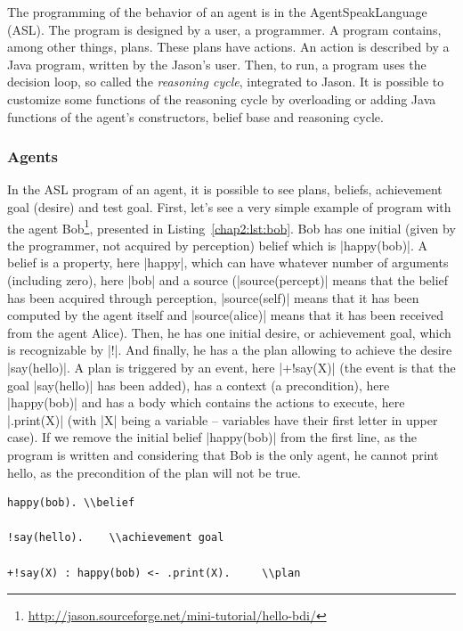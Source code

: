 \documentclass[a4paper,11pt,twoside]{StyleThese}
\begin{document}
The programming of the behavior of an agent is in the AgentSpeakLanguage (ASL). The program is designed by a user, a programmer. A program contains, among other things, plans. These plans have actions. An action is described by a Java program, written by the Jason's user. Then, to run, a program uses the decision loop, so called the \textit{reasoning cycle}, integrated to Jason. It is possible to customize some functions of the reasoning cycle by overloading or adding Java functions of the agent's constructors, belief base and reasoning cycle. 

\subsubsection{Agents} In the ASL program of an agent, it is possible to see plans, beliefs, achievement goal (desire) and test goal. First, let's see a very simple example of program with the agent Bob\footnote{\url{http://jason.sourceforge.net/mini-tutorial/hello-bdi/}}, presented in Listing~\ref{chap2:lst:bob}. Bob has one initial (\ie given by the programmer, not acquired by perception) belief which is |happy(bob)|. A belief is a property, here |happy|, which can have whatever number of arguments (including zero), here |bob| and a source (\eg |source(percept)| means that the belief has been acquired through perception, |source(self)| means that it has been computed by the agent itself and |source(alice)| means that it has been received from the agent Alice). Then, he has one initial desire, or achievement goal, which is recognizable by |!|. And finally, he has a the plan allowing to achieve the desire |say(hello)|. A plan is triggered by an event, here |+!say(X)| (\ie the event is that the goal |say(hello)| has been added), has a context (\ie a precondition), here |happy(bob)| and has a body which contains the actions to execute, here |.print(X)| (with |X| being a variable -- variables have their first letter in upper case). If we remove the initial belief |happy(bob)| from the first line, as the program is written and considering that Bob is the only agent, he cannot print hello, as the precondition of the plan will not be true.

\begin{lstlisting}[caption={ASL program of Bob, a Jason agent}, label={chap2:lst:bob}]
happy(bob).	\\belief

!say(hello).	\\achievement goal

+!say(X) : happy(bob) <- .print(X).		\\plan
\end{lstlisting} 
\end{document}
